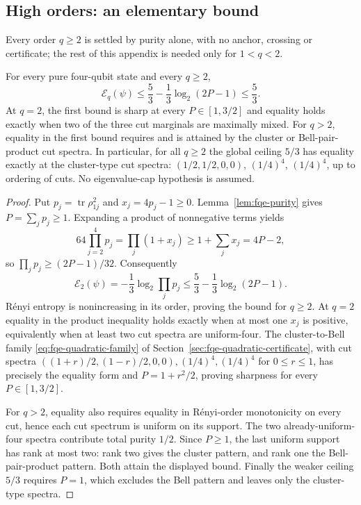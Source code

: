 \subsection{High orders: an elementary bound}\label{sec:fqe-renyi-high-order}
Every order $q\ge2$ is settled by purity alone, with no anchor, crossing or certificate; the rest of this appendix
is needed only for $1<q<2$.

\begin{corollary}
\label{cor:fqe-renyi-two-up}
For every pure four-qubit state and every $q\ge2$,
\[
\boxed{\quad
\mathcal E_q(\psi)\le\frac53-\frac13\log_2(2P-1)\le\frac53.
\quad}
\tag{R2}\label{eq:fqe-renyi-two-up}
\]
At $q=2$, the first bound is sharp at every $P\in[1,3/2]$ and equality
holds exactly when two of the three cut marginals are maximally mixed.
For $q>2$, equality in the first bound requires and is attained by the
cluster or Bell-pair-product cut spectra. In particular, for all $q\ge2$
the global ceiling $5/3$ has equality exactly at the cluster-type cut
spectra: $(1/2,1/2,0,0)$, $(1/4)^4$, $(1/4)^4$, up to ordering of cuts.
No eigenvalue-cap hypothesis is assumed.
\end{corollary}
\begin{proof}
Put $p_j=\operatorname{tr}\rho_{1j}^2$ and $x_j=4p_j-1\ge0$.
Lemma~\ref{lem:fqe-purity} gives $P=\sum_jp_j\ge1$. Expanding a product
of nonnegative terms yields
\[
64\prod_{j=2}^4p_j=\prod_j(1+x_j)
\ge1+\sum_jx_j=4P-2,
\]
so $\prod_jp_j\ge(2P-1)/32$. Consequently
\[
\mathcal E_2(\psi)=-\frac13\log_2\prod_jp_j
\le\frac53-\frac13\log_2(2P-1).
\]
R\'enyi entropy is nonincreasing in its order, proving the bound for
$q\ge2$. At $q=2$ equality in the product inequality holds exactly
when at most one $x_j$ is positive, equivalently when at least two
cut spectra are uniform-four. The cluster-to-Bell family
\eqref{eq:fqe-quadratic-family} of Section~\ref{sec:fqe-quadratic-certificate}, with cut spectra
$((1+r)/2,(1-r)/2,0,0),(1/4)^4,(1/4)^4$ for $0\le r\le1$, has precisely
the equality form and $P=1+r^2/2$, proving sharpness for every
$P\in[1,3/2]$.

For $q>2$, equality also requires equality in R\'enyi-order
monotonicity on every cut, hence each cut spectrum is uniform on its
support. The two already-uniform-four spectra contribute total purity
$1/2$. Since $P\ge1$, the last uniform support has rank at most two:
rank two gives the cluster pattern, and rank one the Bell-pair-product
pattern. Both attain the displayed bound. Finally the weaker ceiling
$5/3$ requires $P=1$, which excludes the Bell pattern and leaves only
the cluster-type spectra.
\end{proof}
